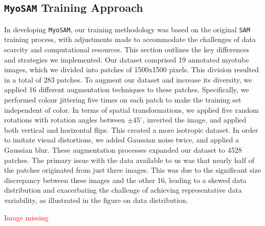 \subsection{\texttt{MyoSAM} Training Approach}
In developing \texttt{MyoSAM}, our training methodology was based on the original \texttt{SAM} training process, with adjustments made to accommodate the challenges of data scarcity and computational resources. This section outlines the key differences and strategies we implemented.
Our dataset comprised 19 annotated myotube images, which we divided into patches of 1500x1500 pixels. This division resulted in a total of 283 patches. To augment our dataset and increase its diversity, we applied 16 different augmentation techniques to these patches. Specifically, we performed colour jittering five times on each patch to make the training set independent of color. In terms of spatial transformations, we applied five random rotations with rotation angles between $\pm 45^{\circ}$, inverted the image, and applied both vertical and horizontal flips. This created a more isotropic dataset. In order to imitate visual distortions, we added Gaussian noise twice, and applied a Gaussian blur. These augmentation processes expanded our dataset to 4528 patches. The primary issue with the data available to us was that nearly half of the patches originated from just three images. This was due to the significant size discrepancy between these images and the other 16, leading to a skewed data distribution and exacerbating the challenge of achieving representative data variability, as illustrated in the figure on data distribution.

\textcolor{red}{Image missing}

